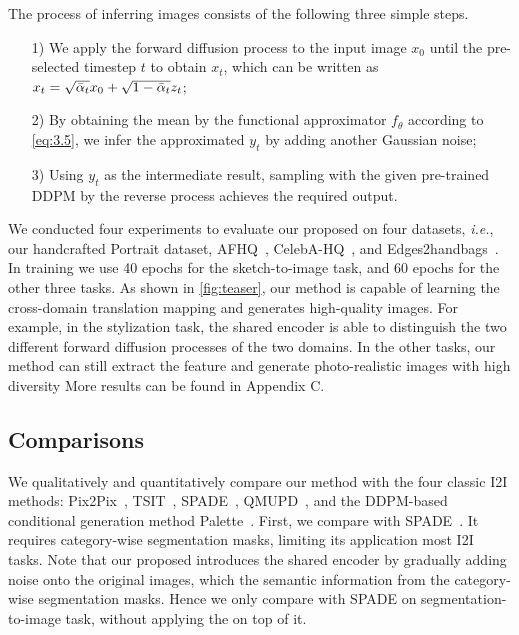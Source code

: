 \setlength{\tabcolsep}{5pt}






The process of inferring images  \method consists of the following three simple steps.
%
\begin{itemize}
\item[1)] We apply the forward diffusion process to the input image $x_0$ until the pre-selected timestep $t$ to obtain $x_t$, which can be written as $x_t=\sqrt{\bar{\alpha}_{t}}x_0+\sqrt{1-\bar{\alpha}_{t}}z_t$;
%
\item[2)] By obtaining the mean by the functional approximator $f_{\theta}$ according to \cref{eq:3.5}, we infer the approximated $y_t$ by adding another Gaussian noise;
%
\item[3)] Using $y_t$ as the intermediate result, sampling with the given pre-trained DDPM by the reverse process achieves the required output.
\end{itemize}

We conducted four experiments to evaluate our proposed \method on four datasets, \textit{i.e.}, our handcrafted Portrait dataset, AFHQ~\cite{choi2020stargan}, CelebA-HQ~\cite{karras2018progressive}, and Edges2handbags~\cite{zhu2016generative,xie15hed}.
%
In training\sqq{,} we use 40 epochs for the sketch-to-image task, and 60 epochs for the other three tasks.%
%
As shown in \cref{fig:teaser}, our method is capable of learning the cross-domain translation mapping and generates high-quality images.
%
For example, in the stylization task, the shared encoder is able to distinguish the two different forward diffusion processes of the two domains.
%
In the other tasks, our method can still extract the  feature and generate photo-realistic images with high diversity 
%
More results can be found in Appendix C.



\subsection{Comparisons}\label{subsec:Comparison}

We qualitatively and quantitatively compare our method with the four classic I2I methods:  Pix2Pix~\cite{isola2017image}, TSIT~\cite{jiang2020tsit}, SPADE~\cite{park2019SPADE}, QMUPD~\cite{YiLLR22}, and the DDPM-based conditional generation method Palette~\cite{saharia2021palette}.
%
First, we compare with SPADE~\cite{park2019SPADE}.
%
It requires category-wise segmentation masks, limiting its application  most I2I tasks.
%
Note that our proposed \method introduces the shared encoder by gradually adding noise onto the original images, which  the semantic information from the category-wise segmentation masks.
%
Hence\sqq{,} we only compare with SPADE on segmentation-to-image task, without applying the \method on top of it.
%

